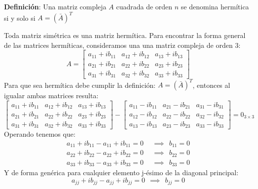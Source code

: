 \textbf{Definición}: Una matriz compleja \(A\) cuadrada de orden \(n\) se denomina hermítica si y solo si \(A = (\bar{A})^T\)

Toda matriz simétrica es una matriz hermítica. Para encontrar la forma general de las matrices hermíticas, consideramos una una matriz compleja de orden \(3\):
\[
  A = \begin{bmatrix}
    a_{11} + ib_{11} & a_{12} + ib_{12} & a_{13} + ib_{13} \\
    a_{21} + ib_{21} & a_{22} + ib_{22} & a_{23} + ib_{23} \\
    a_{31} + ib_{31} & a_{32} + ib_{32} & a_{33} + ib_{33}
  \end{bmatrix}
\]
Para que sea hermítica debe cumplir la definición: \(A = (\bar{A})^T\), entonces al igualar ambas matrices resulta:
\[
  \begin{bmatrix}
    a_{11} + ib_{11} & a_{12} + ib_{12} & a_{13} + ib_{13} \\
    a_{21} + ib_{21} & a_{22} + ib_{22} & a_{23} + ib_{23} \\
    a_{31} + ib_{31} & a_{32} + ib_{32} & a_{33} + ib_{33}
  \end{bmatrix} - \begin{bmatrix}
    a_{11} - ib_{11} & a_{21} - ib_{21} & a_{31} - ib_{31} \\
    a_{12} - ib_{12} & a_{22} - ib_{22} & a_{32} - ib_{32} \\
    a_{13} - ib_{13} & a_{23} - ib_{23} & a_{33} - ib_{33}
  \end{bmatrix} = 0_{3 \times 3}
\]
Operando tenemos que:
\begin{align*}
  a_{11} + ib_{11} - a_{11} + ib_{11} = 0 ~~ &\implies ~~ b_{11} = 0 \\
  a_{22} + ib_{22} - a_{22} + ib_{22} = 0 ~~ &\implies ~~ b_{22} = 0 \\
  a_{33} + ib_{33} - a_{33} + ib_{33} = 0 ~~ &\implies ~~ b_{33} = 0 
\end{align*}
Y de forma genérica para cualquier elemento j-ésimo de la diagonal principal:
\[
  a_{jj} + ib_{jj} - a_{jj} + ib_{jj} = 0 ~~ \implies ~~ b_{jj} = 0
\]

